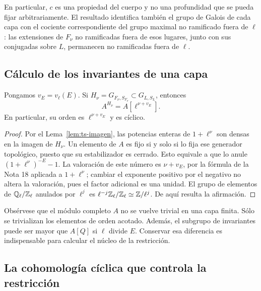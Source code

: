 En particular, $c$ es una propiedad del cuerpo y no una profundidad que se pueda fijar arbitrariamente. El resultado identifica también el grupo de Galois de cada capa con el cociente correspondiente del grupo maximal no ramificado fuera de $\ell$: las extensiones de $F_\nu$ no ramificadas fuera de esos lugares, junto con sus conjugadas sobre $L$, permanecen no ramificadas fuera de $\ell$.

\subsection{Cálculo de los invariantes de una capa}

\begin{proposicion}
\label{prop:ts-invariantes}
Pongamos $v_E=v_\ell(E)$. Si $H_\nu=G_{F_\nu,S_{F_\nu}}\subset G_{L,S_L}$, entonces
\begin{equation}
 A^{H_\nu}=A[\ell^{\nu+v_E}].
 \label{eq:ts-invariantes}
\end{equation}
En particular, su orden es $\ell^{\nu+v_E}$ y es cíclico.
\end{proposicion}
\begin{proof}
Por el Lema~\ref{lem:ts-imagen}, las potencias enteras de $1+\ell^\nu$ son densas en la imagen de $H_\nu$. Un elemento de $A$ es fijo si y solo si lo fija ese generador topológico, puesto que su estabilizador es cerrado. Esto equivale a que lo anule $(1+\ell^\nu)^{-E}-1$. La valoración de este número es $\nu+v_E$, por la fórmula de la Nota 18 aplicada a $1+\ell^\nu$; cambiar el exponente positivo por el negativo no altera la valoración, pues el factor adicional es una unidad. El grupo de elementos de $\mathbb{Q}_\ell/\mathbb{Z}_\ell$ anulados por $\ell^j$ es $\ell^{-j}\mathbb{Z}_\ell/\mathbb{Z}_\ell\simeq\mathbb{Z}/\ell^j$. De aquí resulta la afirmación.
\end{proof}

Obsérvese que el módulo completo $A$ no se vuelve trivial en una capa finita. Sólo se trivializan los elementos de orden acotado. Además, el subgrupo de invariantes puede ser mayor que $A[Q]$ si $\ell$ divide $E$. Conservar esa diferencia es indispensable para calcular el núcleo de la restricción.

\subsection{La cohomología cíclica que controla la restricción}

